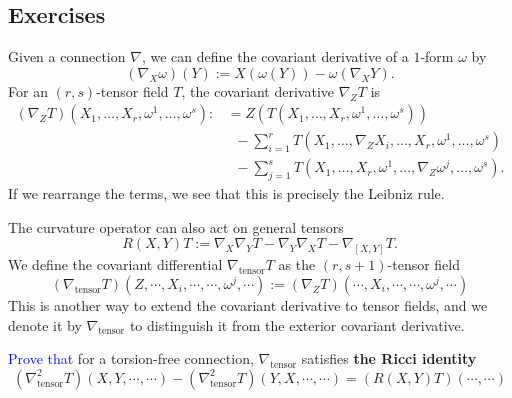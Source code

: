 \newpage
\subsection*{Exercises}
\begin{exercise}
    Given a connection $\nabla$, we can define the covariant derivative of a $1$-form $\omega$ by
    \begin{equation*}
        (\nabla_X \omega)(Y) := X(\omega(Y)) - \omega(\nabla_X Y).
    \end{equation*}
    For an $(r,s)$-tensor field $T$, the covariant derivative $\nabla_Z T$ is 
    \begin{align*}
        (\nabla_Z T)(X_1,\ldots,X_r,\omega^1,\ldots,\omega^s):&= Z(T(X_1,\ldots,X_r,\omega^1,\ldots,\omega^s)) \\ 
        &\;\;- \sum_{i=1}^r T(X_1,\ldots,\nabla_Z X_i,\ldots,X_r,\omega^1,\ldots,\omega^s) \\
        &\;\;- \sum_{j=1}^s T(X_1,\ldots,X_r,\omega^1,\ldots,\nabla_Z \omega^j,\ldots,\omega^s).
    \end{align*}
    If we rearrange the terms, we see that this is precisely the Leibniz rule. 

    The curvature operator can also act on general tensors
    \begin{equation*}
        R(X,Y)T:= \nabla_X \nabla_Y T - \nabla_Y \nabla_X T - \nabla_{[X,Y]} T.
    \end{equation*}
    We define the covariant differential $\nabla_{\text{tensor}} T$ as the $(r,s+1)$-tensor field
    \begin{equation*}
        (\nabla_{\text{tensor}} T)(Z,\cdots,X_i,\cdots,\cdots,\omega^j,\cdots)
        := (\nabla_Z T)(\cdots,X_i,\cdots,\cdots,\omega^j,\cdots)
    \end{equation*}
    This is another way to extend the covariant derivative to tensor fields, 
    and we denote it by $\nabla_{\text{tensor}}$ to distinguish it from the exterior covariant derivative.

    \textcolor{blue}{Prove that} for a torsion-free connection, $\nabla_{\text{tensor}}$ satisfies \textbf{the Ricci identity}
    \begin{equation*}
        (\nabla_{\text{tensor}}^2 T)(X,Y,\cdots,\cdots) - (\nabla_{\text{tensor}}^2 T)(Y,X,\cdots,\cdots) = (R(X,Y)T)(\cdots,\cdots)
    \end{equation*}
\end{exercise}

